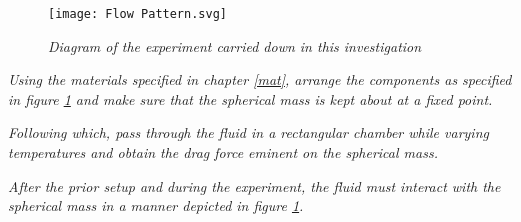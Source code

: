 \begin{figure}[H]
    \centering
    \texttt{[image: Flow Pattern.svg]}
	\caption{\textit{Diagram of the experiment carried down in this investigation}}
    \label{exp1}
\end{figure}


\textit{Using the materials specified in chapter \ref{mat}, arrange the components as specified in figure \ref{exp1} and make sure that the spherical mass is kept about at a fixed point.}

\textit{Following which, pass through the fluid in a rectangular chamber while varying temperatures and obtain the drag force eminent on the spherical mass.}

\textit{After the prior setup and during the experiment, the fluid must interact with the spherical mass in a manner depicted in figure \ref{exp1}.}


